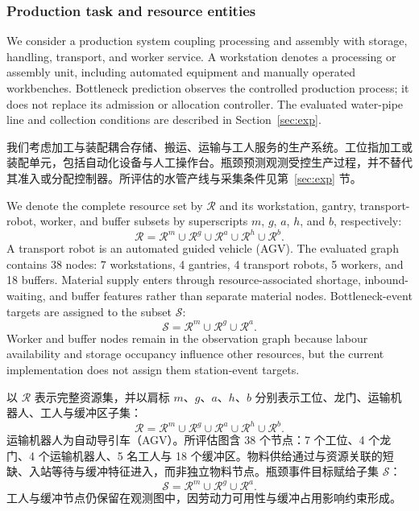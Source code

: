 \documentclass[a4paper,fleqn]{cas-dc}
\newcommand{\zhpara}[1]{%
  \par\begingroup\small\color{black!72}\noindent #1\par\endgroup}
\begin{document}
\subsubsection{Production task and resource entities}

We consider a production system coupling processing and assembly with storage, handling, transport, and worker service. A workstation denotes a processing or assembly unit, including automated equipment and manually operated workbenches. Bottleneck prediction observes the controlled production process; it does not replace its admission or allocation controller. The evaluated water-pipe line and collection conditions are described in Section~\ref{sec:exp}.

\zhpara{我们考虑加工与装配耦合存储、搬运、运输与工人服务的生产系统。工位指加工或装配单元，包括自动化设备与人工操作台。瓶颈预测观测受控生产过程，并不替代其准入或分配控制器。所评估的水管产线与采集条件见第~\ref{sec:exp} 节。}


We denote the complete resource set by $\mathcal{R}$ and its workstation, gantry, transport-robot, worker, and buffer subsets by superscripts $m$, $g$, $a$, $h$, and $b$, respectively:
\begin{equation}
\mathcal{R}=\mathcal{R}^{m}\cup\mathcal{R}^{g}\cup
\mathcal{R}^{a}\cup\mathcal{R}^{h}\cup\mathcal{R}^{b}.
\end{equation}
A transport robot is an automated guided vehicle (AGV). The evaluated graph contains 38 nodes: 7 workstations, 4 gantries, 4 transport robots, 5 workers, and 18 buffers. Material supply enters through resource-associated shortage, inbound-waiting, and buffer features rather than separate material nodes. Bottleneck-event targets are assigned to the subset $\mathcal{S}$:
\begin{equation}
\mathcal{S}=\mathcal{R}^{m}\cup\mathcal{R}^{g}\cup\mathcal{R}^{a}.
\end{equation}
Worker and buffer nodes remain in the observation graph because labour availability and storage occupancy influence other resources, but the current implementation does not assign them station-event targets.

\zhpara{以 $\mathcal{R}$ 表示完整资源集，并以肩标 $m$、$g$、$a$、$h$、$b$ 分别表示工位、龙门、运输机器人、工人与缓冲区子集：
\begin{equation}
\mathcal{R}=\mathcal{R}^{m}\cup\mathcal{R}^{g}\cup
\mathcal{R}^{a}\cup\mathcal{R}^{h}\cup\mathcal{R}^{b}.
\end{equation}
运输机器人为自动导引车（AGV）。所评估图含 38 个节点：7 个工位、4 个龙门、4 个运输机器人、5 名工人与 18 个缓冲区。物料供给通过与资源关联的短缺、入站等待与缓冲特征进入，而非独立物料节点。瓶颈事件目标赋给子集 $\mathcal{S}$：
\begin{equation}
\mathcal{S}=\mathcal{R}^{m}\cup\mathcal{R}^{g}\cup\mathcal{R}^{a}.
\end{equation}
工人与缓冲节点仍保留在观测图中，因劳动力可用性与缓冲占用影响约束形成。}
\end{document}
